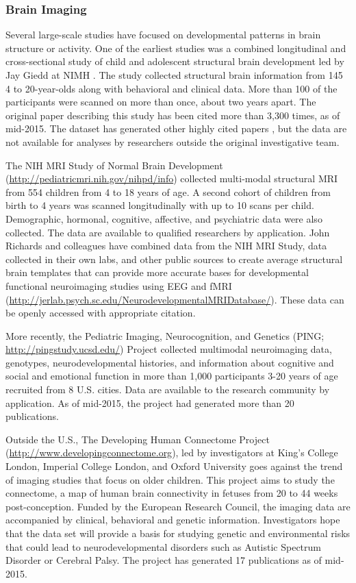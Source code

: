 \documentclass[letterpaper,man,apacite,natbib]{apa6}
\begin{document}
\subsubsection{Brain Imaging}

Several large-scale studies have focused on developmental patterns in brain structure or activity.
One of the earliest studies was a combined longitudinal and cross-sectional study of child and adolescent structural brain development led by Jay Giedd at NIMH \cite{giedd_brain_1999}.
The study collected structural brain information from 145 4 to 20-year-olds along with behavioral and clinical data.
More than 100 of the participants were scanned on more than once, about two years apart.
The original paper describing this study has been cited more than 3,300 times, as of mid-2015.
The dataset has generated other highly cited papers \cite{gogtay_dynamic_2004}, but the data are not available for analyses by researchers outside the original investigative team.

The NIH MRI Study of Normal Brain Development (\url{http://pediatricmri.nih.gov/nihpd/info}) collected multi-modal structural MRI from 554 children from 4 to 18 years of age.
A second cohort of children from birth to 4 years was scanned longitudinally with up to 10 scans per child. 
Demographic, hormonal, cognitive, affective, and psychiatric data were also collected.
The data are available to qualified researchers by application.
John Richards and colleagues have combined data from the NIH MRI Study, data collected in their own labs, and other public sources to create average structural brain templates that can provide more accurate bases for developmental functional neuroimaging studies using EEG and fMRI (\url{http://jerlab.psych.sc.edu/NeurodevelopmentalMRIDatabase/}).
These data can be openly accessed with appropriate citation.

More recently, the Pediatric Imaging, Neurocognition, and Genetics (PING; \url{http://pingstudy.ucsd.edu/}) Project collected multimodal neuroimaging data, genotypes, neurodevelopmental histories, and information about cognitive and social and emotional function in more than 1,000 participants 3-20 years of age recruited from 8 U.S. cities. 
Data are available to the research community by application.
As of mid-2015, the project had generated more than 20 publications.

Outside the U.S., The Developing Human Connectome Project (\url{http://www.developingconnectome.org}), led by investigators at King’s College London, Imperial College London, and Oxford University goes against the trend of imaging studies that focus on older children.
This project aims to study the connectome, a map of human brain connectivity in fetuses from 20 to 44 weeks post-conception.
Funded by the European Research Council, the imaging data are accompanied by clinical, behavioral and genetic information.
Investigators hope that the data set will provide a basis for studying genetic and environmental risks that could lead to neurodevelopmental disorders such as Autistic Spectrum Disorder or Cerebral Palsy.
The project has generated 17 publications as of mid-2015.
\end{document}
